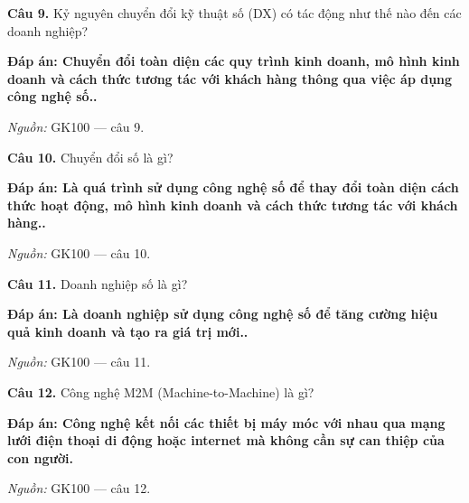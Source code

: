 \documentclass[11pt,a4paper]{article}
\begin{document}
\textbf{Câu 9.} Kỷ nguyên chuyển đổi kỹ thuật số (DX) có tác động như thế nào đến các doanh nghiệp?\par
{\color{answer}\textbf{Đáp án: Chuyển đổi toàn diện các quy trình kinh doanh, mô hình kinh doanh và cách thức tương tác với khách hàng thông qua việc áp dụng công nghệ số..}}\par
{\footnotesize\color{sourcegray}\textit{Nguồn:} GK100 — câu 9.\par}
\vspace{3pt}\par\noindent{\color{black!18}\rule{\linewidth}{0.3pt}}\par\medskip

\textbf{Câu 10.} Chuyển đổi số là gì?\par
{\color{answer}\textbf{Đáp án: Là quá trình sử dụng công nghệ số để thay đổi toàn diện cách thức hoạt động, mô hình kinh doanh và cách thức tương tác với khách hàng..}}\par
{\footnotesize\color{sourcegray}\textit{Nguồn:} GK100 — câu 10.\par}
\vspace{3pt}\par\noindent{\color{black!18}\rule{\linewidth}{0.3pt}}\par\medskip

\textbf{Câu 11.} Doanh nghiệp số là gì?\par
{\color{answer}\textbf{Đáp án: Là doanh nghiệp sử dụng công nghệ số để tăng cường hiệu quả kinh doanh và tạo ra giá trị mới..}}\par
{\footnotesize\color{sourcegray}\textit{Nguồn:} GK100 — câu 11.\par}
\vspace{3pt}\par\noindent{\color{black!18}\rule{\linewidth}{0.3pt}}\par\medskip

\textbf{Câu 12.} Công nghệ M2M (Machine-to-Machine) là gì?\par
{\color{answer}\textbf{Đáp án: Công nghệ kết nối các thiết bị máy móc với nhau qua mạng lưới điện thoại di động hoặc internet mà không cần sự can thiệp của con người.}}\par
{\footnotesize\color{sourcegray}\textit{Nguồn:} GK100 — câu 12.\par}
\vspace{3pt}\par\noindent{\color{black!18}\rule{\linewidth}{0.3pt}}\par\medskip
\end{document}
